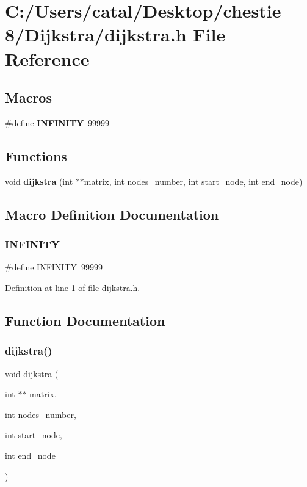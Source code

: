 \section{C\+:/\+Users/catal/\+Desktop/chestie 8/\+Dijkstra/dijkstra.h File Reference}
\label{dijkstra_8h}
\subsection*{Macros}
\begin{DoxyCompactItemize}
\item 
\#define \textbf{ I\+N\+F\+I\+N\+I\+TY}~99999
\end{DoxyCompactItemize}
\subsection*{Functions}
\begin{DoxyCompactItemize}
\item 
void \textbf{ dijkstra} (int $\ast$$\ast$matrix, int nodes\+\_\+number, int start\+\_\+node, int end\+\_\+node)
\end{DoxyCompactItemize}


\subsection{Macro Definition Documentation}
\mbox{\label{dijkstra_8h_a956e2723d559858d08644ac99146e910}} 
\subsubsection{I\+N\+F\+I\+N\+I\+TY}
{\footnotesize\ttfamily \#define I\+N\+F\+I\+N\+I\+TY~99999}



Definition at line 1 of file dijkstra.\+h.



\subsection{Function Documentation}
\mbox{\label{dijkstra_8h_a461b3d88c3d897ae12cb9ab16f58b9fe}} 
\subsubsection{dijkstra()}
{\footnotesize\ttfamily void dijkstra (\begin{DoxyParamCaption}\item[{int $\ast$$\ast$}]{matrix,  }\item[{int}]{nodes\+\_\+number,  }\item[{int}]{start\+\_\+node,  }\item[{int}]{end\+\_\+node }\end{DoxyParamCaption})}

